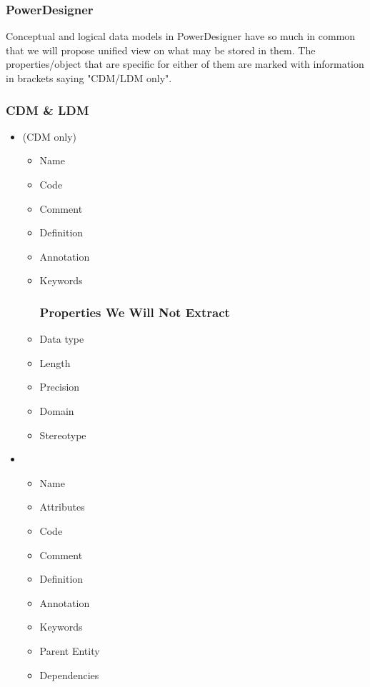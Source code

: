\documentclass[12pt,a4paper]{report}
\begin{document}
\subsubsection{PowerDesigner}

Conceptual and logical data models in PowerDesigner have so much in common that we will propose unified view on what may be stored in them. The properties/object that are specific for either of them are marked with information in brackets saying "CDM/LDM only".

\subsubsection{CDM \& LDM}

\begin{itemize}
	\item {} (CDM only)
	\begin{itemize}
		\item Name
		\item Code 
		\item Comment
		\item Definition
		\item Annotation
		\item Keywords
		\subsubsection{Properties We Will Not Extract}
		\item Data type
		\item Length
		\item Precision
		\item Domain
		\item Stereotype
	\end{itemize}
	\item {}
	\begin{itemize}
		\item Name 
		\item Attributes
		\item Code 
		\item Comment
		\item Definition
		\item Annotation
		\item Keywords
		\item Parent Entity
		\item Dependencies

\end{itemize}
\end{itemize}
\end{document}
